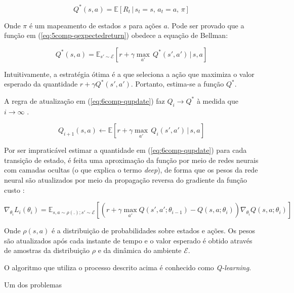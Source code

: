 \begin{equation}\label{eq:5comp-qexpectedreturn}
	Q^*(s,a) = \mathbb{E} \left[
	R_t\,|\,s_t=s,\,a_t=a,\,\pi
	\right]
\end{equation}

Onde $\pi$ é um mapeamento de estados $s$ para ações $a$. Pode ser provado que a função em (\ref{eq:5comp-qexpectedreturn}) obedece a equação de Bellman:

\begin{equation}
	Q^*(s,a) = \mathbb{E}_{s'\sim\mathcal{E} }\left[ r + \gamma \max_{a'} \, Q^*(s',a')\,|\,s,a \right]
\end{equation}

Intuitivamente, a estratégia ótima é a que seleciona a ação que maximiza o valor esperado da quantidade $r+\gamma Q^*(s',a')$. Portanto, estima-se a função $Q^*$.

A regra de atualização em (\ref{eq:6comp-qupdate}) faz $Q_i\to Q^*$ à medida que $i\to\infty$ \cite{silver2013dqn}.

\begin{equation}\label{eq:6comp-qupdate}
	Q_{i+1}(s,a) \leftarrow \mathbb{E}\left[ r + \gamma \max_{a'} \, Q_i(s',a')\,|\,s,a \right]
\end{equation}

Por ser impraticável estimar a quantidade em (\ref{eq:6comp-qupdate}) para cada transição de estado, é feita uma aproximação da função por meio de redes neurais com camadas ocultas (o que explica o termo \textit{deep}), de forma que os pesos da rede neural são atualizados por meio da propagação reversa do gradiente da função custo \cite{silver2013dqn}:

\begin{equation}
	\nabla_{\theta_i}L_i(\theta_i)=\mathbb{E}_{s,a\sim \rho(.);s'\sim\mathcal{E}}
	\left[ 
	\left(r+\gamma \max_{a'}Q(s',a';\theta_{i-1})-Q(s,a;\theta_i)
	\right)
	\nabla_{\theta_i}Q(s,a;\theta_i)
	\right]
\end{equation}

Onde $\rho(s,a)$ é a distribuição de probabilidades sobre estados e ações. Os pesos são atualizados após cada instante de tempo e o valor esperado é obtido através de amostras da distribuição $\rho$ e da dinâmica do ambiente $\mathcal{E}$.

O algoritmo que utiliza o processo descrito acima é conhecido como \textit{Q-learning}.

Um dos problemas 





